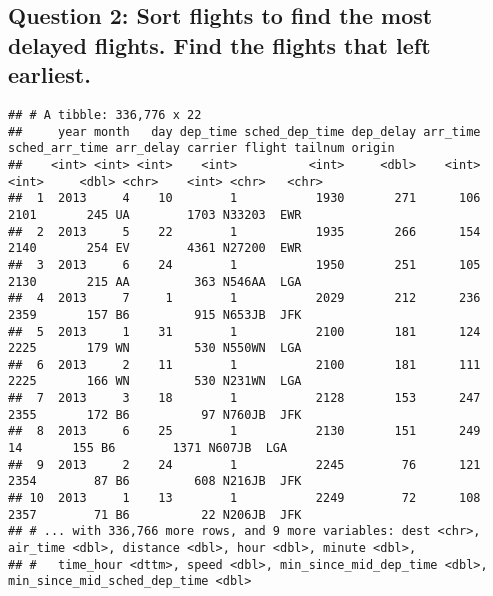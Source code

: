 \documentclass[
]{book}
\newenvironment{Shaded}{\begin{snugshade}}{\end{snugshade}}
\newcommand{\KeywordTok}[1]{\textcolor[rgb]{0.13,0.29,0.53}{\textbf{#1}}}
\newcommand{\NormalTok}[1]{#1}
\newcommand{\OperatorTok}[1]{\textcolor[rgb]{0.81,0.36,0.00}{\textbf{#1}}}
\newcommand{\StringTok}[1]{\textcolor[rgb]{0.31,0.60,0.02}{#1}}
\begin{document}
\hypertarget{question-2-sort-flights-to-find-the-most-delayed-flights.-find-the-flights-that-left-earliest.}{%
\subsection{Question 2: Sort flights to find the most delayed flights. Find the flights that left earliest.}\label{question-2-sort-flights-to-find-the-most-delayed-flights.-find-the-flights-that-left-earliest.}}

\begin{Shaded}
\end{Shaded}

\begin{verbatim}
## # A tibble: 336,776 x 22
##     year month   day dep_time sched_dep_time dep_delay arr_time sched_arr_time arr_delay carrier flight tailnum origin
##    <int> <int> <int>    <int>          <int>     <dbl>    <int>          <int>     <dbl> <chr>    <int> <chr>   <chr> 
##  1  2013     4    10        1           1930       271      106           2101       245 UA        1703 N33203  EWR   
##  2  2013     5    22        1           1935       266      154           2140       254 EV        4361 N27200  EWR   
##  3  2013     6    24        1           1950       251      105           2130       215 AA         363 N546AA  LGA   
##  4  2013     7     1        1           2029       212      236           2359       157 B6         915 N653JB  JFK   
##  5  2013     1    31        1           2100       181      124           2225       179 WN         530 N550WN  LGA   
##  6  2013     2    11        1           2100       181      111           2225       166 WN         530 N231WN  LGA   
##  7  2013     3    18        1           2128       153      247           2355       172 B6          97 N760JB  JFK   
##  8  2013     6    25        1           2130       151      249             14       155 B6        1371 N607JB  LGA   
##  9  2013     2    24        1           2245        76      121           2354        87 B6         608 N216JB  JFK   
## 10  2013     1    13        1           2249        72      108           2357        71 B6          22 N206JB  JFK   
## # ... with 336,766 more rows, and 9 more variables: dest <chr>, air_time <dbl>, distance <dbl>, hour <dbl>, minute <dbl>,
## #   time_hour <dttm>, speed <dbl>, min_since_mid_dep_time <dbl>, min_since_mid_sched_dep_time <dbl>
\end{verbatim}
\end{document}
